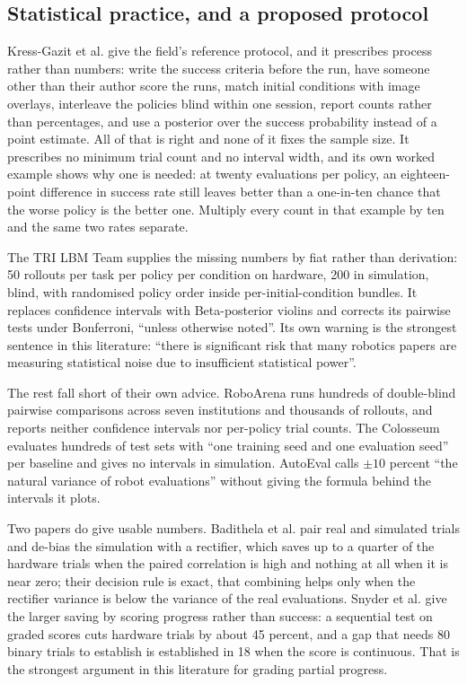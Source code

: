 \subsection{Statistical practice, and a proposed protocol}
\label{subsec:statistics}

Kress-Gazit et al. \cite{kress_gazit_policy_eval_2024} give the field's reference protocol, and
it prescribes process rather than numbers: write the success criteria before the run, have someone
other than their author score the runs, match initial conditions with image overlays, interleave
the policies blind within one session, report counts rather than percentages, and use a posterior
over the success probability instead of a point estimate. All of that is right and none of it
fixes the sample size. It prescribes no minimum trial count and no interval width, and its own
worked example shows why one is needed: at twenty evaluations per policy, an eighteen-point
difference in success rate still leaves better than a one-in-ten chance that the worse policy is
the better one. Multiply every count in that example by ten and the same two rates separate.

The TRI LBM Team \cite{lbm_careful_examination_2025} supplies the missing numbers by fiat rather
than derivation: 50 rollouts per task per policy per condition on hardware, 200 in simulation,
blind, with randomised policy order inside per-initial-condition bundles. It replaces confidence
intervals with Beta-posterior violins and corrects its pairwise tests under Bonferroni, ``unless
otherwise noted''. Its own warning is the strongest sentence in this literature: ``there is
significant risk that many robotics papers are measuring statistical noise due to insufficient
statistical power''.

The rest fall short of their own advice. RoboArena \cite{roboarena_2025} runs hundreds of
double-blind pairwise comparisons across seven institutions and thousands of rollouts, and reports
neither confidence intervals nor per-policy trial counts. The Colosseum \cite{colosseum_2024}
evaluates hundreds of test sets with ``one training seed and one evaluation seed'' per baseline and
gives no intervals in simulation. AutoEval \cite{autoeval_2025} calls $\pm 10$ percent ``the
natural variance of robot evaluations'' without giving the formula behind the intervals it
plots.

Two papers do give usable numbers. Badithela et al. \cite{suresim_2025} pair real and simulated
trials and de-bias the simulation with a rectifier, which saves up to a quarter of the hardware
trials when the paired correlation is high and nothing at all when it is near zero; their decision
rule is exact, that combining helps only when the rectifier variance is below the variance of the
real evaluations. Snyder et al. \cite{beyond_binary_success_2026} give the larger saving by scoring
progress rather than success: a sequential test on graded scores cuts hardware trials by about 45
percent, and a gap that needs 80 binary trials to establish is established in 18 when the score is
continuous. That is the strongest argument in this literature for grading partial progress.


